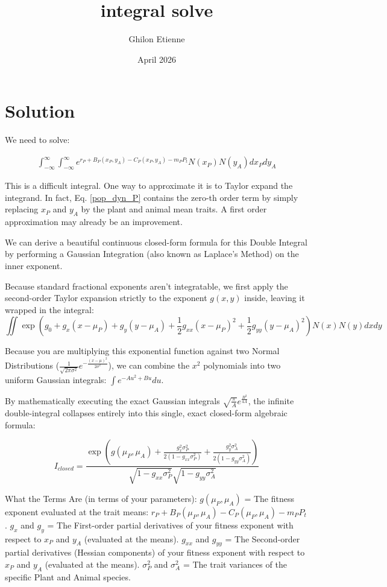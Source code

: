 \documentclass{article}
\title{integral solve}
\author{Ghilon Etienne}
\date{April 2026}
\begin{document}
\maketitle

\section{Solution}
We need to solve:

\begin{align}
\int^\infty_{-\infty} \int^\infty_{-\infty} e^{r_{P} + B_{P}(x_P,y_A) - C_{P}(x_P,y_A) - m_{P} P_{t}} N(x_P) N(y_A) dx_P dy_A   
\end{align}

This is a difficult integral. One way to approximate it is to Taylor expand the integrand. In fact, Eq. \ref{pop_dyn_P} contains the zero-th order term by simply replacing $x_P$ and $y_A$ by the plant and animal mean traits. A first order approximation may already be an improvement. \vspace{\baselineskip}

We can derive a beautiful continuous closed-form formula for this Double Integral by performing a Gaussian Integration (also known as Laplace's Method) on the inner exponent.

Because standard fractional exponents aren't integratable, we first apply the second-order Taylor expansion strictly to the exponent $g(x,y)$ inside, leaving it wrapped in the integral: $$ \iint \exp\left(g_0 + g_x(x-\mu_P) + g_y(y-\mu_A) + \frac{1}{2}g_{xx}(x-\mu_P)^2 + \frac{1}{2}g_{yy}(y-\mu_A)^2\right) N(x) N(y) dx dy $$

Because you are multiplying this exponential function against two Normal Distributions ($\frac{1}{\sqrt{2\pi\sigma^2}} e^{-\frac{(x-\mu)^2}{2\sigma^2}}$), we can combine the $x^2$ polynomials into two uniform Gaussian integrals: $\int e^{-A u^2 + B u} du$.

By mathematically executing the exact Gaussian integrals $\sqrt{\frac{\pi}{A}} e^{\frac{B^2}{4A}}$, the infinite double-integral collapses entirely into this single, exact closed-form algebraic formula:

$$ I_{closed} = \frac{ \exp\left( g(\mu_P, \mu_A) + \frac{g_x^2 \sigma_P^2}{2(1 - g_{xx} \sigma_P^2)} + \frac{g_y^2 \sigma_A^2}{2(1 - g_{yy} \sigma_A^2)} \right) } { \sqrt{1 - g_{xx} \sigma_P^2} \sqrt{1 - g_{yy} \sigma_A^2} } $$

What the Terms Are (in terms of your parameters):
$g(\mu_P, \mu_A)$ = The fitness exponent evaluated at the trait means: $r_P + B_P(\mu_P,\mu_A) - C_P(\mu_P,\mu_A) - m_P P_{t}$.
$g_x$ and $g_y$ = The First-order partial derivatives of your fitness exponent with respect to $x_P$ and $y_A$ (evaluated at the means).
$g_{xx}$ and $g_{yy}$ = The Second-order partial derivatives (Hessian components) of your fitness exponent with respect to $x_P$ and $y_A$ (evaluated at the means).
$\sigma_P^2$ and $\sigma_A^2$ = The trait variances of the specific Plant and Animal species.
\end{document}
